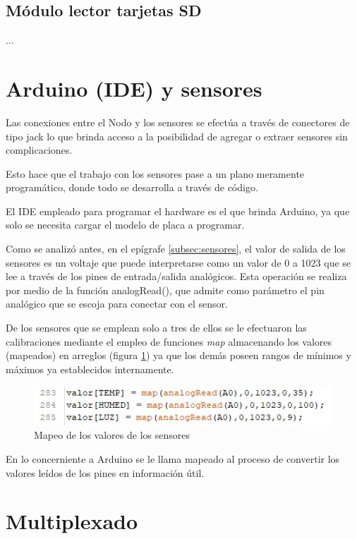 \subsection{Módulo lector tarjetas SD}

...

\section{Arduino (IDE) y sensores}

Las conexiones entre el Nodo y los sensores se efectúa a través de conectores de tipo jack lo que brinda acceso a la posibilidad de agregar o extraer sensores sin complicaciones.

Esto hace que el trabajo con los sensores pase a un plano meramente programático, donde todo se desarrolla a través de código.

El IDE empleado para programar el hardware es el que brinda Arduino, ya que solo se necesita cargar el modelo de placa a programar.

Como se analizó antes, en el epígrafe \ref{subsec:sensores}, el valor de salida de los sensores es un voltaje que puede interpretarse como un valor de 0 a 1023 que se lee a través de los pines de entrada/salida analógicos.
Esta operación se realiza por medio de la función analogRead(), que admite como parámetro el pin analógico que se escoja para conectar con el sensor.

De los sensores que se emplean solo a tres de ellos se le efectuaron las calibraciones mediante el empleo de funciones \textit{map} almacenando los valores (mapeados) en arreglos (figura \ref{imag:mapeo_sensores}) ya que los demás poseen rangos de mínimos y máximos ya establecidos internamente.

\begin{figure}[H]
    \centering
    \includegraphics{imagenes/mapeado.jpg}
    \caption{Mapeo de los valores de los sensores}
    \label{imag:mapeo_sensores}
\end{figure}

En lo concerniente a Arduino se le llama mapeado al proceso de convertir los valores leídos de los pines en información útil. 

\section{Multiplexado}

